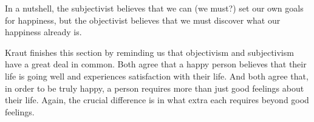 \documentclass[12pt,letterpaper]{article}
\begin{document}
In a nutshell, the subjectivist believes that we can (we must?) set our own goals for happiness, but the objectivist believes that we must discover what our happiness already is.

Kraut finishes this section by reminding us that objectivism and subjectivism have a great deal in common.
Both agree that a happy person believes that their life is going well and experiences satisfaction with their life.
And both agree that, in order to be truly happy, a person requires more than just good feelings about their life.
Again, the crucial difference is in what extra each requires beyond good feelings.

\newpage\
\pagestyle{references}
\printbibliography[title={Bibliography}]
\end{document}
